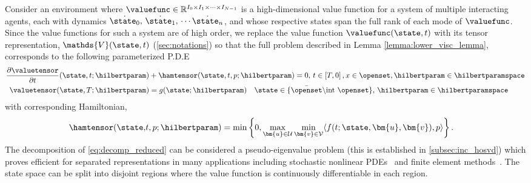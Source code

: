 Consider an environment where $\valuefunc \in \mathbb{R}^{I_0 \times I_1 \times \cdots \times I_{N-1}}$ is a high-dimensional value function for a system  of multiple interacting agents, each with dynamics $\dot{\state_0}, \, \dot{\state_1}, \, \cdots \dot{\state_n}$, and whose respective states span the full rank of each mode of $\valuefunc$. Since the value functions for such a system are of high order, we replace the value function $\valuefunc(\state, t)$ with its tensor representation,  $\mathds{V}(\state, t)$ (\cf \autoref{sec:notations}) so that  the full problem described in Lemma \ref{lemma:lower_visc_lemma}, corresponds to the following parameterized P.D.E 
%
\begin{subequations}
	\begin{align}
		 \dfrac{\partial \valuetensor}{\partial t}(\state, t; \hilbertparam) &+ \hamtensor (\state, t, p; \hilbertparam) = 0, \, t \in \left[T, 0\right],  x \in \openset, \hilbertparam \in \hilbertparamspace  \\
		\valuetensor(\state, T; \hilbertparam) &= g(\state; \hilbertparam) \quad \state \in  \{ \bar{\openset} \backslash \text{int } \openset\}, \,  \hilbertparam \in \hilbertparamspace
		\label{eq:lower_visc_boundary_param}
	\end{align}
	\label{eq:lower_visc_param}
\end{subequations}
%
with corresponding Hamiltonian, 
%
\begin{align}
	\hamtensor(\state, &t, p; \hilbertparam) = \min\left\{0,\max_{\bm{u} \in \mathcal{U}} \min_{\bm{v} \in \mathcal{V}} \langle f(t; \state, \bm{u}, \bm{v}), p  \rangle \right\}.  
\end{align}
%
The decomposition of \eqref{eq:decomp_reduced} can be considered a pseudo-eigenvalue problem (this is established in \autoref{subsec:inc_hosvd}) %
which proves efficient for separated representations in many applications including stochastic nonlinear PDEs~\cite{Nouy2009, LadevezeBook} and finite element methods~\cite{NouyFEM}. The state space can be split into disjoint regions where the value function is continuously differentiable in each region. 
